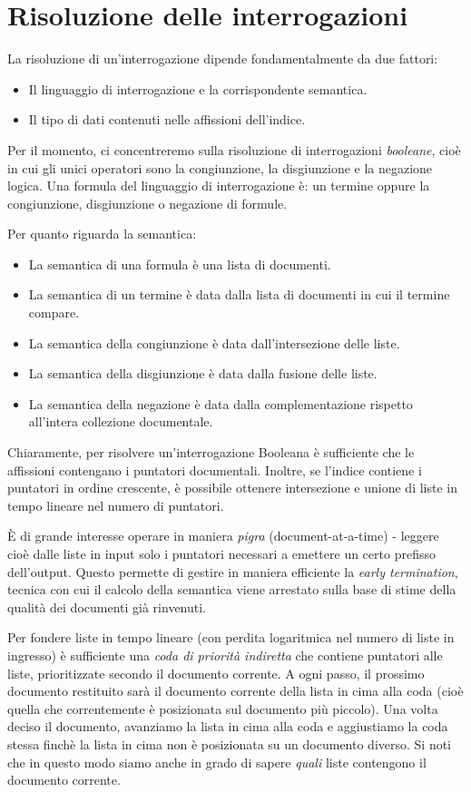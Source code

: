 \section{Risoluzione delle interrogazioni}
La risoluzione di un'interrogazione dipende fondamentalmente da due fattori:
\begin{itemize}
    \item Il linguaggio di interrogazione e la corrispondente semantica.
    \item Il tipo di dati contenuti nelle affissioni dell'indice.
\end{itemize}
Per il momento, ci concentreremo sulla risoluzione di interrogazioni \textit{booleane}, cioè in cui gli unici operatori sono la congiunzione, la disgiunzione e la negazione logica. Una formula del linguaggio di interrogazione è: un termine oppure la congiunzione, disgiunzione o negazione di formule.

Per quanto riguarda la semantica:
\begin{itemize}
    \item La semantica di una formula è una lista di documenti.
    \item La semantica di un termine è data dalla lista di documenti in cui il termine compare.
    \item La semantica della congiunzione è data dall'intersezione delle liste.
    \item La semantica della disgiunzione è data dalla fusione delle liste.
    \item La semantica della negazione è data dalla complementazione rispetto all'intera collezione documentale.
\end{itemize}
Chiaramente, per risolvere un'interrogazione Booleana è sufficiente che le affissioni contengano i puntatori documentali. Inoltre, se l'indice contiene i puntatori in ordine crescente, è possibile ottenere intersezione e unione di liste in tempo lineare nel numero di puntatori.

È di grande interesse operare in maniera \textit{pigra} (document-at-a-time) - leggere cioè dalle liste in input solo i puntatori necessari a emettere un certo prefisso dell'output. Questo permette di gestire in maniera efficiente la \textit{early termination}, tecnica con cui il calcolo della semantica viene arrestato sulla base di stime della qualità dei documenti già rinvenuti.

Per fondere liste in tempo lineare (con perdita logaritmica nel numero di liste in ingresso) è sufficiente una \textit{coda di priorità indiretta} che contiene puntatori alle liste, prioritizzate secondo il documento corrente. A ogni passo, il prossimo documento restituito sarà il documento corrente della lista in cima alla coda (cioè quella che correntemente è posizionata sul documento più piccolo). Una volta deciso il documento, avanziamo la lista in cima alla coda e aggiustiamo la coda stessa finchè la lista in cima non è posizionata su un documento diverso. Si noti che in questo modo siamo anche in grado di sapere \textit{quali} liste contengono il documento corrente.


